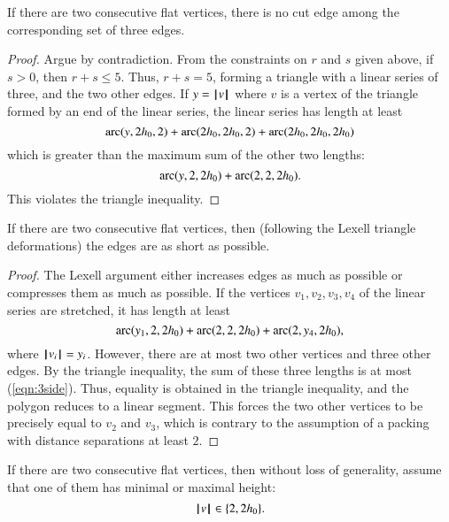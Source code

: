 {\begin{lemma}
If there are two consecutive flat vertices, there is no cut edge among the corresponding set of three edges.
\end{lemma}

\begin{proof}  Argue by contradiction.  From the constraints on $r$ and $s$ given above, if $s>0$, then $r+s\le 5$.  Thus, $r+s=5$, forming a triangle with a linear series of three, and the two other edges.  If $y={{\hskip0.1em|\hskip-0.15em|\hskip0.1em}v{\hskip0.1em|\hskip-0.15em|\hskip0.1em}}$ where $v$ is a vertex of the triangle formed by an end of the linear series, the linear series has length at least
$$
\operatorname{arc}(y,2{h_0},2)+\operatorname{arc}(2{h_0},2{h_0},2) +\operatorname{arc}(2{h_0},2{h_0},2{h_0})
$$
which is greater than the maximum sum of the other two lengths:
$$
\operatorname{arc}(y,2,2{h_0})+\operatorname{arc}(2,2,2{h_0}).
$$
This violates the triangle inequality.
\end{proof}

\begin{lemma}  If there are two consecutive flat vertices, then (following the Lexell triangle deformations) the edges are as short as possible.
\end{lemma}

\begin{proof} The Lexell argument either increases edges as much as possible or compresses them as much as possible.  If the vertices $v_1,v_2,v_3,v_4$ of the linear series are stretched, it has length at least
\begin{equation}\label{eqn:3side}
\operatorname{arc}(y_1,2,2{h_0})+\operatorname{arc}(2,2,2{h_0})+\operatorname{arc}(2,y_4,2{h_0}),
\end{equation}
where ${{\hskip0.1em|\hskip-0.15em|\hskip0.1em}v_i{\hskip0.1em|\hskip-0.15em|\hskip0.1em}}=y_i$.
However, there are at most two other vertices and three other edges.  By the triangle inequality, the sum of these three lengths is at most (\ref{eqn:3side}).
Thus, equality is obtained in the triangle inequality, and the polygon reduces to a linear segment.  This forces the two other vertices to be precisely equal to $v_2$ and $v_3$, which is contrary to the assumption of a packing with distance separations at least $2$.
\end{proof}

\begin{lemma} If there are two consecutive flat vertices, then without loss of generality,  assume that one of them has minimal or maximal height:
$${{\hskip0.1em|\hskip-0.15em|\hskip0.1em}v{\hskip0.1em|\hskip-0.15em|\hskip0.1em}}\in \{2,2{h_0}\}.$$
\end{lemma}

}
